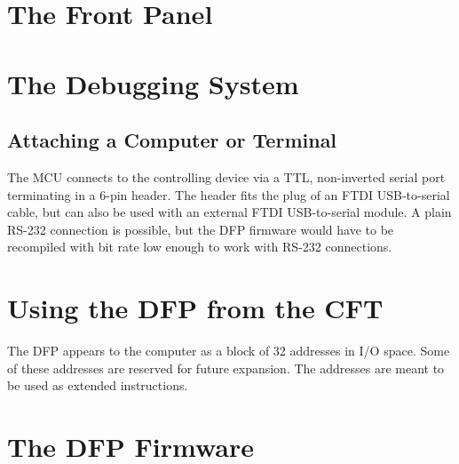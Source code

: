 \section{The Front Panel}

\section{The Debugging System}

\subsection{Attaching a Computer or Terminal}

The MCU connects to the controlling device via a TTL, non-inverted serial port
terminating in a 6-pin header. The header fits the plug of an FTDI
USB-to-serial cable, but can also be used with an external FTDI USB-to-serial
module. A plain RS-232 connection is possible, but the DFP firmware would have
to be recompiled with bit rate low enough to work with RS-232 connections.

\section{Using the DFP from the CFT}

The DFP appears to the computer as a block of 32 addresses in I/O space. Some
of these addresses are reserved for future expansion. The addresses are meant
to be used as \glspl{extended instruction}.

\section{The DFP Firmware}

